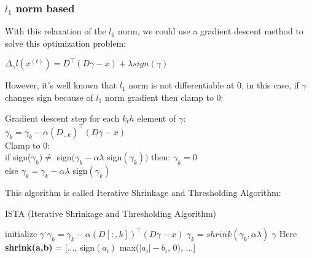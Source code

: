 \subsubsection{$l_1$ norm based}
With this relaxation of the $l_0$ norm, we could use a gradient descent method to solve this optimization problem:\\
\begin{center}
$\Delta_{\gamma} l(x^{(t)}) = D^{\intercal} (D \gamma - x) + \lambda sign(\gamma)$
\end{center}
However,  it's well known that $l_1$ norm is not differentiable at 0, in this case, if $\gamma$ changes sign because of $l_1$ norm gradient then clamp to 0:
\begin{center}
 Gradient descent step for each $k_th$ element of $\gamma$:\\\vspace{0.2cm}
 $\gamma_k = \gamma_k - \alpha (D_{.,k})^{\intercal} (D \gamma - x)$\\\vspace{0.3cm}
 Clamp to 0:\\ \vspace{0.2cm}
  if  sign($\gamma_k) \neq$ sign$(\gamma_k - \alpha \lambda$ sign$(\gamma_k))$ then: $\gamma_k = 0$\\
\indent else $\gamma_k = \gamma_k - \alpha \lambda$ sign$(\gamma_k)$
\end{center}
This algorithm is called Iterative Shrinkage and Thresholding Algorithm:
\begin{algorithm}
 \caption{ISTA (Iterative Shrinkage and Thresholding Algorithm)}
 \begin{algorithmic}
  \STATE initialize $\gamma$ 
        \STATE $\gamma_k = \gamma_k - \alpha (D[:,k])^{\intercal}  (D\gamma - x)$
        \STATE $\gamma_k = shrink(\gamma_k,\alpha\lambda)$
        \ENDFOR
    \ENDWHILE
\RETURN $\gamma$
\STATE 
\STATE Here \textbf{shrink(a,b) }= [..., sign$(a_i)$ max($|a_i| - b_i$, 0), ...]

 \end{algorithmic}

\end{algorithm}
% 
